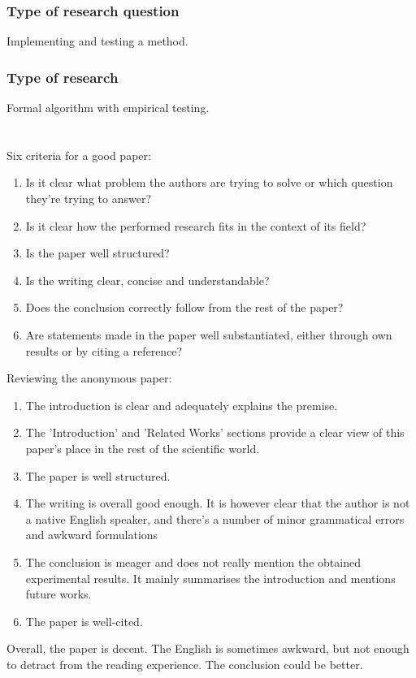 \documentclass[a4paper, 10pt]{article}
\begin{document}
\subsubsection*{Type of research question}
Implementing and testing a method.

\subsubsection*{Type of research}
Formal algorithm with empirical testing.

\section{}
Six criteria for a good paper:
\begin{enumerate}
  \item Is it clear what problem the authors are trying to solve or which
    question they're trying to answer?
  \item Is it clear how the performed research fits in the context of its field?
  \item Is the paper well structured?
  \item Is the writing clear, concise and understandable?
  \item Does the conclusion correctly follow from the rest of the paper?
  \item Are statements made in the paper well substantiated, either through own
    results or by citing a reference?
\end{enumerate}

Reviewing the anonymous paper:
\begin{enumerate}
  \item The introduction is clear and adequately explains the premise.
  \item The 'Introduction' and 'Related Works' sections provide a clear view of
    this paper's place in the rest of the scientific world.
  \item The paper is well structured.
  \item The writing is overall good enough. It is however clear that the author is
    not a native English speaker, and there's a number of minor grammatical
    errors and awkward formulations
  \item The conclusion is meager and does not really mention the obtained
    experimental results. It mainly summarises the introduction and mentions
    future works.
  \item The paper is well-cited.
\end{enumerate}
Overall, the paper is decent. The English is sometimes awkward, but not enough
to detract from the reading experience. The conclusion could be better.
\end{document}
